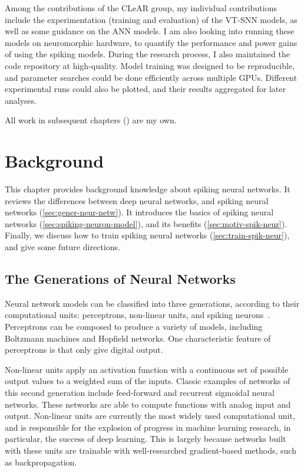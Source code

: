 \documentclass[fyp]{socreport}
\begin{document}
Among the contributions of the CLeAR group, my individual contributions include
the experimentation (training and evaluation) of the VT-SNN models, as well as
some guidance on the ANN models. I am also looking into running these models on
neuromorphic hardware, to quantify the performance and power gains of using the
spiking models. During the research process, I also maintained the code
repository at high-quality. Model training was designed to be reproducible, and
parameter searches could be done efficiently across multiple GPUs. Different
experimental runs could also be plotted, and their results aggregated for later
analyses.

All work in subsequent chapters () %
are my own.

\chapter{Background\label{cha:background}}

This chapter provides background knowledge about spiking neural networks. It
reviews the differences between deep neural networks, and spiking neural
networks (\ref{sec:gener-neur-netw}). It introduces the basics of spiking neural
networks (\ref{sec:spiking-neuron-model}), and its benefits
(\ref{sec:motiv-spik-neur}). Finally, we discuss how to train spiking neural
networks (\ref{sec:train-spik-neur}), and give some future directions.

\section{The Generations of Neural Networks\label{sec:gener-neur-netw}}

Neural network models can be classified into three generations, according to
their computational units: perceptrons, non-linear units, and spiking
neurons~\cite{MAASS19971659}. Perceptrons can be composed to produce a variety
of models, including Boltzmann machines and Hopfield networks. One
characteristic feature of perceptrons is that only give digital output.

Non-linear units apply an activation function with a continuous set of possible
output values to a weighted sum of the inputs. Classic examples of networks of
this second generation include feed-forward and recurrent sigmoidal neural
networks. These networks are able to compute functions with analog input and
output. Non-linear units are currently the most widely used computational unit,
and is responsible for the explosion of progress in machine learning research,
in particular, the success of deep learning. This is largely because networks
built with these units are trainable with well-researched gradient-based
methods, such as backpropagation.
\end{document}
